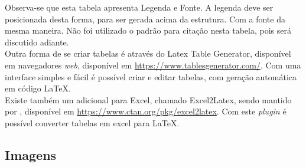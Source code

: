 Observa-se que esta tabela apresenta Legenda e Fonte. A legenda deve ser posicionada desta forma, para ser gerada acima da estrutura. Com a fonte da mesma maneira. Não foi utilizado o padrão para citação nesta tabela, pois será discutido adiante.\\
Outra forma de se criar tabelas é através do Latex Table Generator, disponível em navegadores \textit{web}, disponível em \url{https://www.tablesgenerator.com/}. Com uma interface simples e fácil é possível criar e editar tabelas, com geração automática em código LaTeX.\\
Existe também um adicional para Excel, chamado Excel2Latex, sendo mantido por \cite{chelsea_kirill_2020}, disponível em \url{https://www.ctan.org/pkg/excel2latex}. Com este \textit{plugin} é possível converter tabelas em excel para LaTeX.

\subsection{Imagens}

